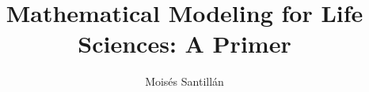 \documentclass[graybox,envcountchap,sectrefs]{svmono}
\begin{document}
\author{Mois\'{e}s Santill\'{a}n}
\title{Mathematical Modeling for Life Sciences: A Primer}
\maketitle

\frontmatter%

%
%
%
%

\tableofcontents

%


\mainmatter%



























%



%
%

\end{document}
